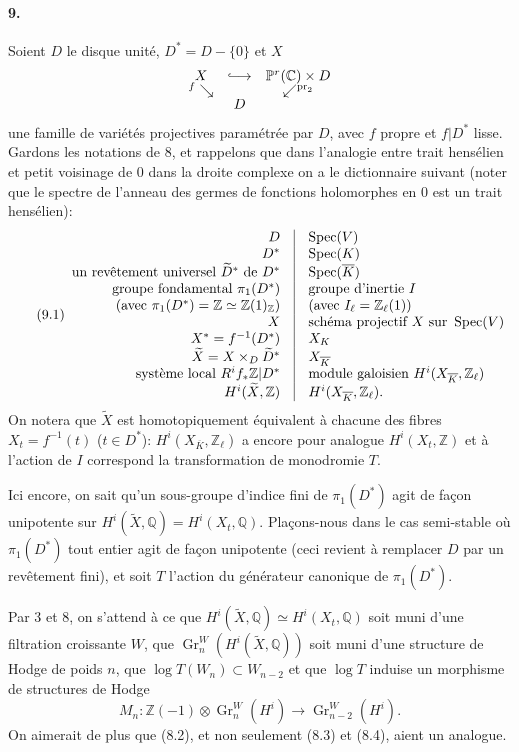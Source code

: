 \documentclass[10pt]{article}
\newcommand{\C}{\mathbb C}
\newcommand{\Q}{\mathbb Q}
\newcommand{\Z}{\mathbb Z}
\newcommand{\Zl}{\mathbb Z_\ell}
\newcommand{\Gr}{\operatorname{Gr}}
\newcommand{\Spec}{\operatorname{Spec}}
\newcommand{\pr}{\operatorname{pr}}
\newcommand{\barK}{\overline{K}}
\newcommand{\wt}{\widetilde}
\begin{document}
\paragraph{9.} Soient $D$ le disque unité, $D^*=D-\{0\}$ et $X$
\[
\begin{array}{ccc}
X&\lhook\joinrel\longrightarrow&\mathbb P^r(\C)\times D\\[-0.2em]
{}^{f}\searrow&&\swarrow^{\pr_2}\\[-0.2em]
& D&
\end{array}
\]
une famille de variétés projectives paramétrée par $D$, avec $f$ propre et $f|D^*$ lisse. Gardons les notations de 8, et rappelons que dans l'analogie entre trait hensélien et petit voisinage de $0$ dans la droite complexe on a le dictionnaire suivant (noter que le spectre de l'anneau des germes de fonctions holomorphes en $0$ est un trait hensélien):
\[
\tag{9.1}
\begin{array}{r@{\quad\vrule\quad}l}
D & \Spec(V)\\
D^* & \Spec(K)\\
\text{un revêtement universel }\wt D^*\text{ de }D^* & \Spec(\barK)\\
\text{groupe fondamental }\pi_1(D^*) & \text{groupe d'inertie }I\\
\text{(avec }\pi_1(D^*)=\Z\simeq\Z(1)_\Z\text{)} & \text{(avec }I_\ell=\Zl(1)\text{)}\\
X & \text{schéma projectif }X\text{ sur }\Spec(V)\\
X^*=f^{-1}(D^*) & X_K\\
\wt X=X\times_D\wt D^* & X_{\barK}\\
\text{système local }R^if_*\Z|D^* & \text{module galoisien }H^i(X_{\barK},\Zl)\\
H^i(\wt X,\Z) & H^i(X_{\barK},\Zl).
\end{array}
\]
On notera que $\wt X$ est homotopiquement équivalent à chacune des fibres $X_t=f^{-1}(t)$ ($t\in D^*$): $H^i(X_{\barK},\Zl)$ a encore pour analogue $H^i(X_t,\Z)$ et à l'action de $I$ correspond la transformation de monodromie $T$.

Ici encore, on sait qu'un sous-groupe d'indice fini de $\pi_1(D^*)$ agit de façon unipotente sur $H^i(\wt X,\Q)=H^i(X_t,\Q)$. Plaçons-nous dans le cas semi-stable où $\pi_1(D^*)$ tout entier agit de façon unipotente (ceci revient à remplacer $D$ par un revêtement fini), et soit $T$ l'action du générateur canonique de $\pi_1(D^*)$.

Par 3 et 8, on s'attend à ce que $H^i(\wt X,\Q)\simeq H^i(X_t,\Q)$ soit muni d'une filtration croissante $W$, que $\Gr_n^W(H^i(\wt X,\Q))$ soit muni d'une structure de Hodge de poids $n$, que $\log T(W_n)\subset W_{n-2}$ et que $\log T$ induise un morphisme de structures de Hodge
\[
M_n:\Z(-1)\otimes\Gr_n^W(H^i)\longrightarrow\Gr_{n-2}^W(H^i).
\]
On aimerait de plus que (8.2), et non seulement (8.3) et (8.4), aient un analogue.
\end{document}
